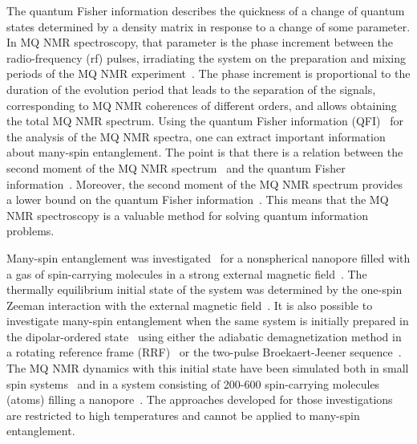 \documentclass[review]{elsarticle}
\begin{document}
The quantum Fisher information describes the quickness of a change of quantum states determined by a density matrix in response to a change of some parameter. 
In MQ NMR spectroscopy, that parameter is the phase increment between the radio-frequency (rf) pulses, irradiating the system on the preparation and mixing periods of the MQ NMR experiment~\cite{Baum_1985}. 
The phase increment is proportional to the duration of the evolution period that leads to the separation of the signals,
corresponding to MQ NMR coherences of different orders, and allows obtaining the total MQ NMR spectrum.
Using the quantum Fisher information (QFI)~\cite{Liu_2014} for the analysis of the MQ NMR spectra, one can extract important information about many-spin entanglement.
The point is that there is a relation between the second moment of the MQ NMR spectrum~\cite{Khitrin_1997} and the quantum Fisher information~\cite{G_rttner_2018,Doronin_2019}.
Moreover, the second moment of the MQ NMR spectrum provides a lower bound on the quantum Fisher information~\cite{G_rttner_2018}.
This means that the MQ NMR spectroscopy is a valuable method for solving quantum information problems.

Many-spin entanglement was investigated~\cite{Doronin_2019} for a nonspherical nanopore filled with a gas of spin-carrying molecules in a strong external magnetic field~\cite{Baugh_2001,Doronin_2009}.
The thermally equilibrium initial state of the system was determined by the one-spin Zeeman interaction with the external magnetic field~\cite{Doronin_2007a}.
It is also possible to investigate many-spin entanglement when the same system is initially prepared in the dipolar-ordered state~\cite{Goldman_1970} using either the adiabatic demagnetization method in a rotating reference frame (RRF)~\cite{Goldman_1970,Slichter_1961} or the two-pulse Broekaert-Jeener sequence~\cite{Goldman_1970,Jeener_1967}.
The MQ NMR dynamics with this initial state have been simulated both in small spin systems~\cite{Doronin_2007a,Doronin_2007b} and in a system consisting of 200-600 spin-carrying molecules (atoms) filling a nanopore~\cite{Doronin_2011}.
The approaches developed for those investigations are restricted to  high temperatures and cannot be applied to  many-spin entanglement.
\end{document}
